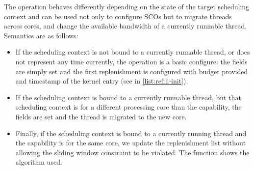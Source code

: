 The \schedcontrolconfigure operation behaves differently depending on the state of the target scheduling
context and can be used not only to configure \glspl{SCO} but to migrate threads across cores, and
change the available bandwidth of a currently runnable thread. Semantics are as follows:

\begin{itemize}
\item If the scheduling context is not bound
to a currently runnable thread, or does not represent any time currently, the operation is 
a basic configure: the fields are
simply set and the first replenishment is configured with budget provided and timestamp of the
kernel entry (see  in \cref{list:refill-init}).
\item If the scheduling context is bound to a currently runnable thread, but that scheduling
context is for a different processing core than the \schedcontrol capability, the fields are
set and the thread is migrated to the new core.  
\item Finally, if the scheduling context is bound to a currently running thread and the
    \schedcontrol capability is for the same core, we update the replenishment list without
    allowing the sliding window constraint to be violated. The function  shows the
    algorithm used.
\end{itemize}

